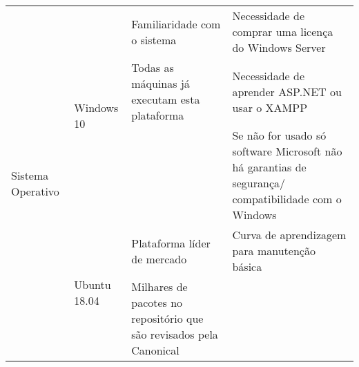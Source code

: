 \begin{longtable}{|p{}|p{}|p{}|p{}|}
	\multirow{5}{*}{Sistema Operativo}                                      & \multirow{3}{*}{Windows 10}                           & Familiaridade com o sistema                                         & Necessidade de comprar uma licença do Windows Server                                                \\
	&                                                       & Todas as máquinas já executam esta plataforma                       & Necessidade de aprender ASP.NET ou usar o XAMPP                                                     \\
	&                                                       &                                                                     & Se não for usado só software Microsoft não há garantias de segurança/ compatibilidade com o Windows \\ \cline{2-4} 
	& \multirow{2}{*}{Ubuntu 18.04}                         & Plataforma líder de mercado                                         & Curva de aprendizagem para manutenção básica                                                        \\
	&                                                       & Milhares de pacotes no repositório que são revisados pela Canonical &                                                                                                     \\ \hline
	

\end{longtable}
